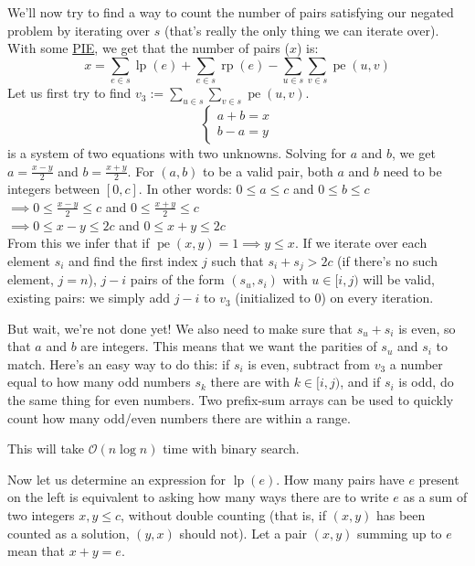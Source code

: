\documentclass{article}
\begin{document}
We'll now try to find a way to count the number of pairs satisfying our negated problem by iterating over $s$ (that's really the only thing we can iterate over). With some \href{https://brilliant.org/wiki/principle-of-inclusion-and-exclusion-pie/}{PIE}, we get that the number of pairs ($x$) is:
$$\displaystyle x=\sum_{e\in s} \operatorname{lp}(e)+\sum_{e \in s}\operatorname{rp}(e) - \sum_{u \in s} \sum_{v \in s} \operatorname{pe}(u,v)$$
Let us first try to find $v_3:=\displaystyle \sum_{u \in s} \sum_{v \in s} \operatorname{pe}(u,v)$.
$$
\begin{cases}
a + b = x \\
b - a = y
\end{cases}
$$
is a system of two equations with two unknowns. Solving for $a$ and $b$, we get $\displaystyle a=\frac{x-y}{2}$ and $\displaystyle b=\frac{x+y}{2}$. For $(a,b)$ to be a valid pair, both $a$ and $b$ need to be integers between $[0,c]$. In other words:
	$\displaystyle 0 \le a \le c$ and $\displaystyle 0 \le b \le c$\\
	$\displaystyle \implies 0 \le \frac{x-y}{2} \le c$ and $\displaystyle 0 \le \frac{x+y}{2} \le c$\\
	$\displaystyle \implies 0 \le x-y \le 2c$ and $\displaystyle 0 \le x+y \le 2c$\\

From this we infer that if $\operatorname{pe}(x,y)=1 \implies y \le x$. If we iterate over each element $s_i$ and find the first index $j$ such that $s_i + s_j > 2c$ (if there's no such element, $j=n$), $j-i$ pairs of the form $(s_u,s_i)$ with $u \in [i, j)$ will be valid, existing pairs: we simply add $j-i$ to $v_3$ (initialized to $0$) on every iteration.

But wait, we're not done yet! We also need to make sure that $s_u+s_i$ is even, so that $a$ and $b$ are integers. This means that we want the parities of $s_u$ and $s_i$ to match. Here's an easy way to do this: if $s_i$ is even, subtract from $v_3$ a number equal to how many odd numbers $s_k$ there are with $k \in [i,j)$, and if $s_i$ is odd, do the same thing for even numbers. Two prefix-sum arrays can be used to quickly count how many odd/even numbers there are within a range.

This will take $\mathcal{O}(n \log n)$ time with binary search.

Now let us determine an expression for $\operatorname{lp}(e)$. How many pairs have $e$ present on the left is equivalent to asking how many ways there are to write $e$ as a sum of two integers $x,y \le c$, without double counting (that is, if $(x,y)$ has been counted as a solution, $(y,x)$ should not). Let a pair $(x,y)$ summing up to $e$ mean that $x+y=e$.
\end{document}
